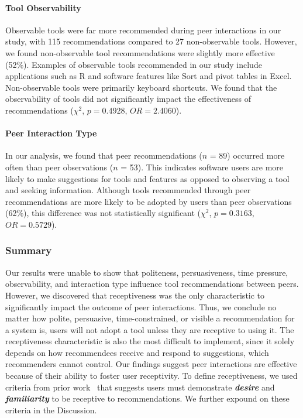 \paragraph*{Tool Observability}

Observable tools were far more recommended during peer interactions in our study, with 115 recommendations compared to 27 non-observable tools. However, we found non-observable tool recommendations were slightly more effective (52\%). Examples of observable tools recommended in our study include applications such as R and software features like Sort and pivot tables in Excel. Non-observable tools were primarily keyboard shortcuts. We found that the observability of tools did not significantly impact the effectiveness of recommendations ($\chi^2$, $p = 0.4928$, $OR = 2.4060$).
 
\paragraph*{Peer Interaction Type}

In our analysis, we found that peer recommendations ($n$ = 89) occurred more often than peer observations ($n$ = 53). This indicates software users are more likely to make suggestions for tools and features as opposed to observing a tool and seeking information. Although tools recommended through peer recommendations are more likely to be adopted by users than peer observations (62\%), this difference was not statistically significant ($\chi^2$, $p = 0.3163$, $OR= 0.5729$).

\subsubsection{Summary}

Our results were unable to show that politeness, persuasiveness, time pressure, observability, and interaction type influence tool recommendations between peers. However, we discovered that receptiveness was the only characteristic to significantly impact the outcome of peer interactions. Thus, we conclude no matter how polite, persuasive, time-constrained, or visible a recommendation for a system is, users will not adopt a tool unless they are receptive to using it. The receptiveness characteristic is also the most difficult to implement, since it solely depends on how recommendees receive and respond to suggestions, which recommenders cannot control. Our findings suggest peer interactions are effective because of their ability to foster user receptivity. To define receptiveness, we used criteria from prior work~\cite{Fogg2009Persuasive} that suggests users must demonstrate \textbf{\em desire} and \textbf{\em familiarity} to be receptive to recommendations. We further expound on these criteria in the Discussion.

